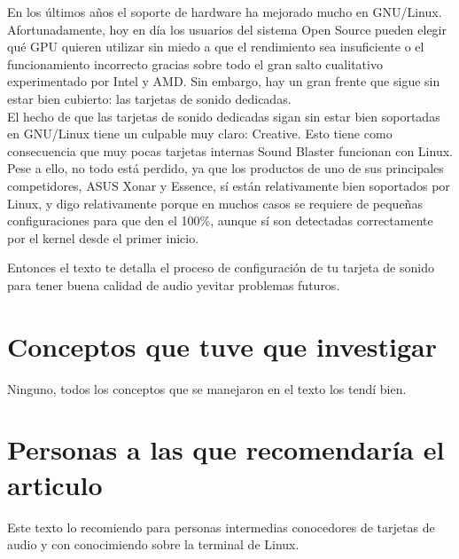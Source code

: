 \documentclass[11pt, a4paper]{report}
\begin{document}
En los últimos años el soporte de hardware ha mejorado mucho en GNU/Linux.
Afortunadamente, hoy en día los usuarios del sistema Open Source pueden elegir
qué GPU quieren utilizar sin miedo a que el rendimiento sea insuficiente o el
funcionamiento incorrecto gracias sobre todo el gran salto cualitativo
experimentado por Intel y AMD. Sin embargo, hay un gran frente que sigue sin
estar bien cubierto: las tarjetas de sonido dedicadas. \\

El hecho de que las tarjetas de sonido dedicadas sigan sin estar bien
soportadas en GNU/Linux tiene un culpable muy claro: Creative. Esto tiene como
consecuencia que muy pocas tarjetas internas Sound Blaster funcionan con Linux.
Pese a ello, no todo está perdido, ya que los productos de uno de sus
principales competidores, ASUS Xonar y Essence, sí están relativamente bien
soportados por Linux, y digo relativamente porque en muchos casos se requiere
de pequeñas configuraciones para que den el 100\%, aunque sí son detectadas
correctamente por el kernel desde el primer inicio.

Entonces el texto te detalla el proceso de configuración de tu tarjeta de sonido
para tener buena calidad de audio yevitar problemas futuros.



\section*{Conceptos que tuve que investigar}
Ninguno, todos los conceptos que se manejaron en el texto los tendí bien.

\section*{Personas a las que recomendaría el articulo}
Este texto lo recomiendo para personas intermedias conocedores de tarjetas de
audio y con conocimiendo sobre la terminal de Linux.
\end{document}
